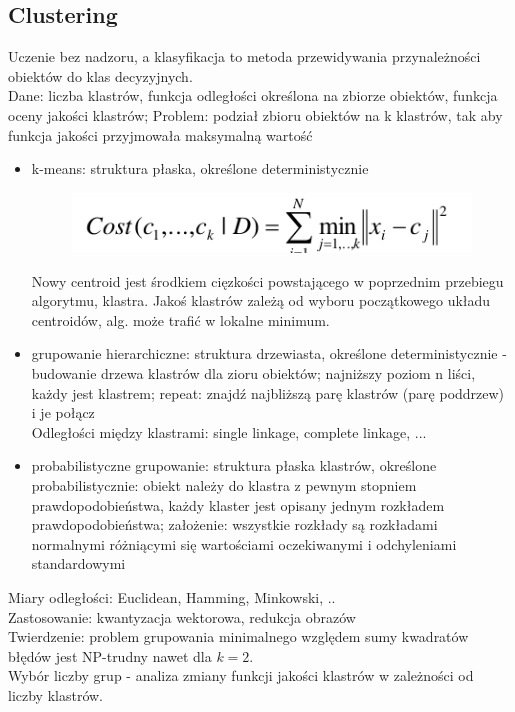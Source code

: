 \documentclass[10pt,a4paper]{article}
\begin{document}
\subsection{Clustering}
Uczenie bez nadzoru, a klasyfikacja to metoda przewidywania przynależności obiektów do klas decyzyjnych. \\
Dane: liczba klastrów, funkcja odległości określona na zbiorze obiektów, funkcja oceny jakości klastrów; Problem: podział zbioru obiektów na k klastrów, tak aby funkcja jakości przyjmowała maksymalną wartość
  \begin{itemize}
    \item k-means: struktura płaska, określone deterministycznie
    \begin{figure}[H]
      \centering
        \includegraphics[scale=0.50]{images/koszt.png}
    \end{figure}
    Nowy centroid jest środkiem cięzkości powstającego w poprzednim przebiegu algorytmu, klastra. Jakoś klastrów zależą od wyboru początkowego układu centroidów, alg. może trafić w lokalne minimum.
    \item grupowanie hierarchiczne: struktura drzewiasta, określone deterministycznie - budowanie drzewa klastrów dla zioru obiektów; najniższy poziom n liści, każdy jest klastrem; repeat: znajdź najbliższą parę klastrów (parę poddrzew) i je połącz \\
    Odległości między klastrami: single linkage, complete linkage, ...
    \item probabilistyczne grupowanie: struktura płaska klastrów, określone probabilistycznie: obiekt należy do klastra z pewnym stopniem prawdopodobieństwa, każdy klaster jest opisany jednym rozkładem prawdopodobieństwa; założenie: wszystkie rozkłady są rozkładami normalnymi różniącymi się wartościami oczekiwanymi i odchyleniami standardowymi
  \end{itemize}
  Miary odległości: Euclidean, Hamming, Minkowski, ..\\
  Zastosowanie: kwantyzacja wektorowa, redukcja obrazów \\
  Twierdzenie: problem grupowania minimalnego względem sumy kwadratów błędów jest NP-trudny nawet dla $k = 2$. \\
  Wybór liczby grup - analiza zmiany funkcji jakości klastrów w zależności od liczby klastrów. \\
\end{document}
